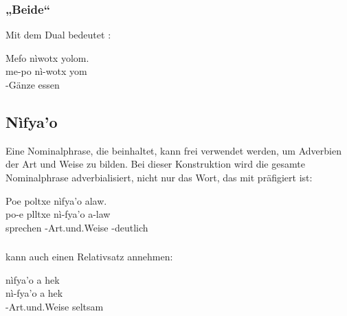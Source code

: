 \subsubsection{„Beide“} Mit dem Dual bedeutet  :

\begin{interlin}
	\glll Mefo nìwotx yolom. \\
	me-po nì-wotx yom \\
	 -Gänze essen \\
\end{interlin}

\subsection{Nìfya'o} Eine Nominalphrase, die  beinhaltet, kann frei verwendet werden, um Adverbien der Art und Weise zu bilden.
Bei dieser Konstruktion wird die gesamte Nominalphrase adverbialisiert, nicht nur das Wort, das mit  präfigiert ist:\label{syn:nifyao}

\begin{interlin}
	\glll \Npawl{}Poe poltxe nìfya'o alaw. \\
	po-e plltxe nì-fya'o a-law \\
	 sprechen -Art.und.Weise -deutlich \\
\end{interlin}

\subsubsection{}  kann auch einen Relativsatz annehmen: 

\begin{interlin}
	\glll \Npawl{}nìfya'o a hek \\
	nì-fya'o a hek \\
	-Art.und.Weise  seltsam \\
\end{interlin}

\subsubsection{} 

